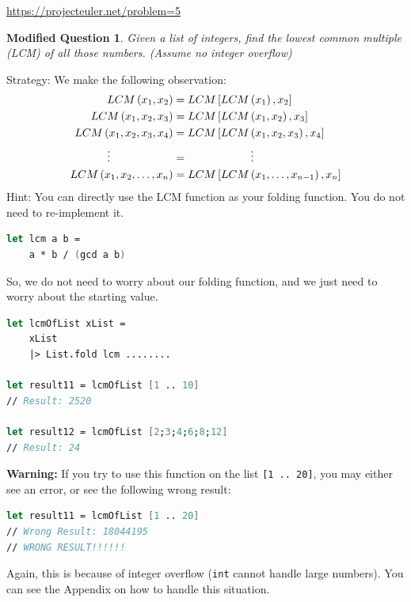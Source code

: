 \documentclass[12pt]{article}
\newtheorem*{modQuestion*}{Modified Question}
\begin{document}
\url{https://projecteuler.net/problem=5}

\begin{modQuestion*}
Given a list of integers, find the lowest common multiple (LCM) of all those numbers. (Assume no integer overflow)
\end{modQuestion*}
Strategy: We make the following observation:
\begin{align*}
LCM\left(x_1, x_2\right) &= LCM\left[LCM\left(x_1\right), x_2\right]
\\LCM\left(x_1, x_2, x_3\right) &= LCM\left[LCM\left(x_1, x_2\right), x_3\right]
\\LCM\left(x_1, x_2, x_3, x_4\right) &= LCM\left[LCM\left(x_1, x_2, x_3\right), x_4\right]
\\ \vdots \hspace{2.0cm}&= \hspace{2.0cm} \vdots
\\LCM\left(x_1, x_2, \ldots, x_n\right) &= LCM\left[LCM\left(x_1, \ldots, x_{n-1}\right), x_n\right]
\end{align*}
Hint: You can directly use the LCM function as your folding function. You do not need to re-implement it. 
\begin{lstlisting}[language=FSharp]
let lcm a b = 
    a * b / (gcd a b)
\end{lstlisting}
So, we do not need to worry about our folding function, and we just need to worry about the starting value.

\begin{lstlisting}[language=FSharp]
let lcmOfList xList =
    xList
    |> List.fold lcm ........

let result11 = lcmOfList [1 .. 10]
// Result: 2520

let result12 = lcmOfList [2;3;4;6;8;12]
// Result: 24
\end{lstlisting}

{\Large \textbf{Warning:}} If you try to use this function on the list \texttt{[1 .. 20]}, you may either see an error, or see the following wrong result:
\begin{lstlisting}[language=FSharp]
let result11 = lcmOfList [1 .. 20]
// Wrong Result: 18044195
// WRONG RESULT!!!!!!
\end{lstlisting}
Again, this is because of integer overflow (\texttt{int} cannot handle large numbers). You can see the Appendix on how to handle this situation.

\pagebreak
\end{document}

